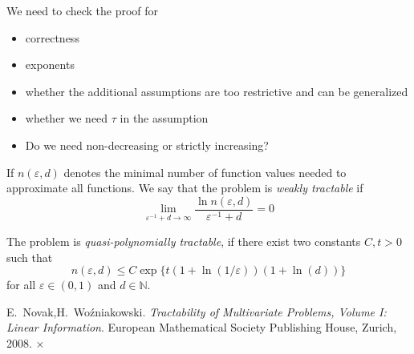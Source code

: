 \documentclass[11pt,a4paper]{article}
\newcommand{\fred}[1]{\begingroup\color{blue}#1\endgroup}
\begin{document}
{\fred{We need to check the proof for 
\begin{itemize}
\item correctness
\item exponents
\item whether the additional assumptions are too restrictive and can be generalized
\item whether we need $\tau$ in the assumption
\item Do we need non-decreasing or strictly increasing? 
\end{itemize}}
\begin{definition}
If $n(\varepsilon,d)$ denotes the minimal number of function values needed to approximate all functions. We say that the problem is \emph{weakly tractable} if
    \[\lim_{\varepsilon^{-1}+d\rightarrow \infty} \frac{\ln n(\varepsilon,d)}{\varepsilon^{-1}+d} = 0\]
\end{definition}
\begin{definition}
    The problem is \emph{quasi-polynomially tractable}, if there exist two constants $C, t> 0$ such that 
    \[
    n(\varepsilon,d) \leq C\exp\{t(1+\ln(1/\varepsilon))(1+\ln(d))\}
    \] for all $\varepsilon \in (0,1)$ and $d\in\mathbb{N}$.
\end{definition}
\begin{thebibliography}{99}

 E.~Novak,H.~Wo\'zniakowski. \textit{Tractability of Multivariate Problems, Volume I: Linear Information}. 
European Mathematical Society Publishing House, Zurich, 2008.
 ×
\end{thebibliography}
\end{document}
